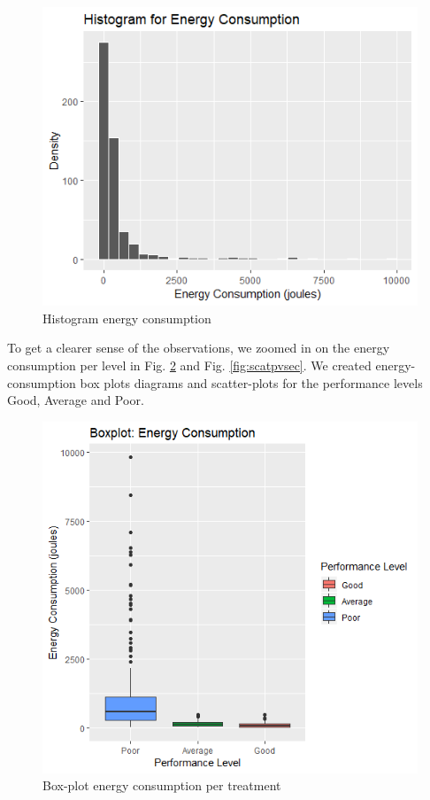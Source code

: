 \begin{figure}[H]
  \includegraphics[width=\linewidth]{./NewImages/Fig_4_Histogram_Energy_Consumption.png}
  \caption{Histogram energy consumption}
  \label{fig:histec}
\end{figure}

To get a clearer sense of the observations, we zoomed in on the energy consumption per level in Fig. \ref{fig:boxecv} and Fig. \ref{fig:scatpvsec}. We created energy-consumption box plots diagrams and scatter-plots for the performance levels Good, Average and Poor.

\begin{figure}[H]
  \includegraphics[width=\linewidth]{./NewImages/Fig_5_Box_Plot_Energy_Per_Level.png}
  \caption{Box-plot energy consumption per treatment}
  \label{fig:boxecv}
\end{figure}

